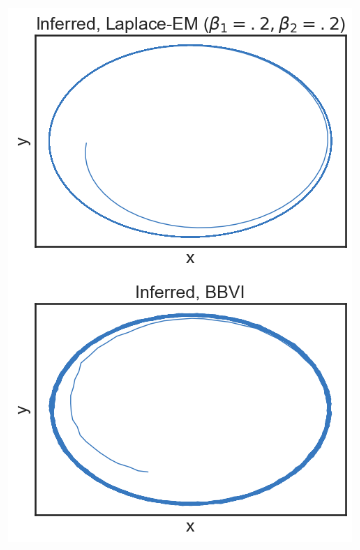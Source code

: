 \begin{figure}
\begin{subfigure}[b]{0.309\linewidth}
        \includegraphics[width=\linewidth]{./Figures/bautin-unstab.png}
        \caption{}
        \label{bautinresults:b}
        \vspace{4ex}
    \end{subfigure}%
    \begin{subfigure}[b]{0.33\linewidth}
        \centering

\end{subfigure}
\end{figure}
